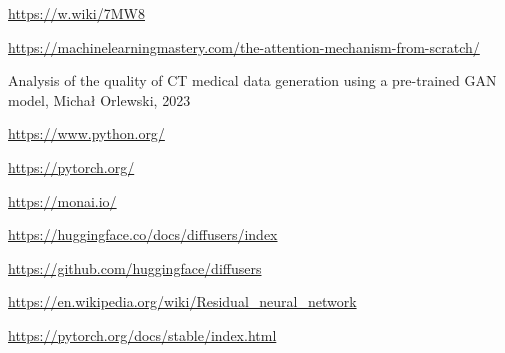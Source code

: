 \documentclass[11pt,a4paper]{report}
\begin{document}
\begin{thebibliography}{99}
\url{https://w.wiki/7MW8}

\url{https://machinelearningmastery.com/the-attention-mechanism-from-scratch/}

Analysis of the quality of CT medical data generation using a pre-trained GAN model, Michał Orlewski, 2023

\url{https://www.python.org/}

\url{https://pytorch.org/}

\url{https://monai.io/}
  
\url{https://huggingface.co/docs/diffusers/index}

\url{https://github.com/huggingface/diffusers}

\url{https://en.wikipedia.org/wiki/Residual_neural_network}

\url{https://pytorch.org/docs/stable/index.html}
  
\end{thebibliography}
\end{document}
